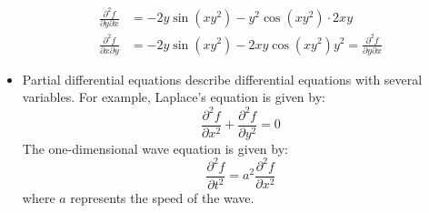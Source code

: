\begin{itemize}
\begin{example}
\begin{align}
            \frac{\partial^2 f}{\partial y\partial x} &= -2y\sin(xy^2)-y^2\cos(xy^2)\cdot 2xy \\ 
            \frac{\partial^2 f}{\partial x\partial y} &= -2y\sin(xy^2)-2xy\cos(xy^2)y^2 = \frac{\partial^2 f}{\partial y \partial x}
        \end{align}
    \end{example}
    \item Partial differential equations describe differential equations with several variables. For example, Laplace's equation is given by:
    \begin{equation}
        \frac{\partial^2 f}{\partial x^2} + \frac{\partial^2 f}{\partial y^2} = 0
    \end{equation}
    The one-dimensional wave equation is given by:
    \begin{equation}
        \frac{\partial^2 f}{\partial t^2}=a^2\frac{\partial^2 f}{\partial x^2}
    \end{equation}
    where $a$ represents the speed of the wave.
\end{itemize}